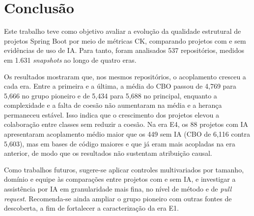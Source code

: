 \section{Conclusão}
\label{sec:conclusao}

Este trabalho teve como objetivo avaliar a evolução da qualidade estrutural de projetos Spring Boot por meio de métricas CK, comparando projetos com e sem evidências de uso de IA. Para tanto, foram analisados 537 repositórios, medidos em 1.631 \emph{snapshots} ao longo de quatro eras.

Os resultados mostraram que, nos mesmos repositórios, o acoplamento cresceu a cada era. Entre a primeira e a última, a média do CBO passou de 4,769 para 5,666 no grupo pioneiro e de 5,434 para 5,688 no principal, enquanto a complexidade e a falta de coesão não aumentaram na média e a herança permaneceu estável. Isso indica que o crescimento dos projetos elevou a colaboração entre classes sem reduzir a coesão. Na era E4, os 88 projetos com IA apresentaram acoplamento médio maior que os 449 sem IA (CBO de 6,116 contra 5,603), mas em bases de código maiores e que já eram mais acopladas na era anterior, de modo que os resultados não sustentam atribuição causal.

Como trabalhos futuros, sugere-se aplicar controles multivariados por tamanho, domínio e equipe às comparações entre projetos com e sem IA, e investigar a assistência por IA em granularidade mais fina, no nível de método e de \emph{pull request}. Recomenda-se ainda ampliar o grupo pioneiro com outras fontes de descoberta, a fim de fortalecer a caracterização da era E1.
